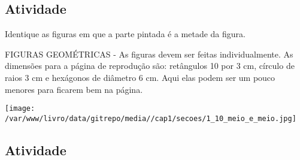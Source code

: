 \documentclass[a4,12pt]{book}
\begin{document}
\subsection{Atividade}








Identique as figuras em que a parte pintada é a metade da figura.
\begin{imagem*}[breakable]{}{}    FIGURAS GEOMÉTRICAS - As figuras devem ser feitas individualmente. As dimensões para a página de reprodução são: retângulos 10 por 3 cm, círculo de raios 3 cm e hexágonos de diâmetro 6 cm. Aqui elas podem ser um pouco menores para ficarem bem na página.  
  
    \texttt{[image: /var/www/livro/data/gitrepo/media//cap1/secoes/1\_10\_meio\_e\_meio.jpg]}  
  
\end{imagem*}











\subsection{Atividade}
\end{document}
